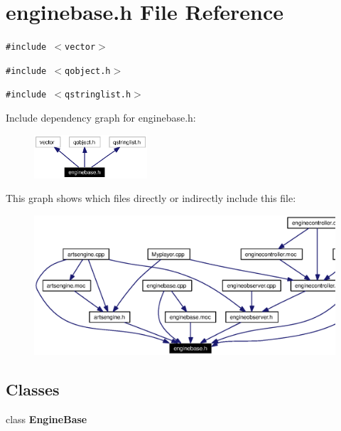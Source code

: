 \section{enginebase.h File Reference}
\label{enginebase_8h}


{\tt \#include $<$vector$>$}\par
{\tt \#include $<$qobject.h$>$}\par
{\tt \#include $<$qstringlist.h$>$}\par


Include dependency graph for enginebase.h:\begin{figure}[H]
\begin{center}
\leavevmode
\includegraphics[width=119pt]{enginebase_8h__incl}
\end{center}
\end{figure}


This graph shows which files directly or indirectly include this file:\begin{figure}[H]
\begin{center}
\leavevmode
\includegraphics[width=362pt]{enginebase_8h__dep__incl}
\end{center}
\end{figure}
\subsection*{Classes}
\begin{CompactItemize}
\item 
class {\bf Engine\-Base}
\end{CompactItemize}
